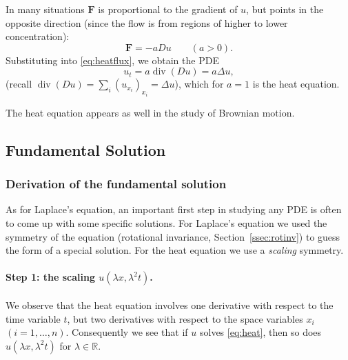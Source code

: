 \documentclass[11pt]{article}
\theoremstyle{plain}
\theoremstyle{definition}
\theoremstyle{remark}
\begin{document}
In many situations $\mathbf F$ is proportional to the gradient of $u$, but points in the opposite direction (since the flow is from regions of higher to lower concentration):
$$ \mathbf F = -aDu \qquad (a > 0). $$
Substituting into \eqref{eq:heatflux}, we obtain the PDE
$$ u_t = a\operatorname{div}(Du) = a\Delta u, $$
(recall $\operatorname{div}(Du) = \sum_i (u_{x_i})_{x_i} = \Delta u$), which for $a = 1$ is the heat equation.

The heat equation appears as well in the study of Brownian motion.

\subsection{Fundamental Solution}

\subsubsection{Derivation of the fundamental solution}

As for Laplace's equation, an important first step in studying any PDE is often to come up with some specific solutions. For Laplace's equation we used the symmetry of the equation (rotational invariance, Section~\ref{ssec:rotinv}) to guess the form of a special solution. For the heat equation we use a \emph{scaling} symmetry.

\paragraph{Step 1: the scaling $u(\lambda x, \lambda^2 t)$.}
We observe that the heat equation involves one derivative with respect to the time variable $t$, but two derivatives with respect to the space variables $x_i$ $(i = 1,\dots,n)$. Consequently we see that if $u$ solves \eqref{eq:heat}, then so does $u(\lambda x, \lambda^2 t)$ for $\lambda \in \mathbb{R}$.
\end{document}

